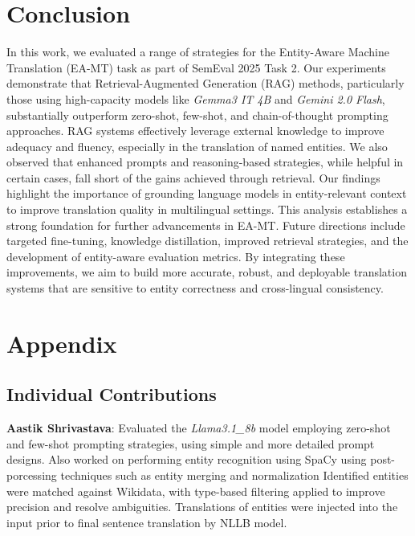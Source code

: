 \documentclass{ecai}
\begin{document}
\section{Conclusion}
\label{sec:conclusion}
In this work, we evaluated a range of strategies for the Entity-Aware Machine Translation (EA-MT) 
task as part of SemEval 2025 Task 2. Our experiments demonstrate that Retrieval-Augmented 
Generation (RAG) methods, particularly those using high-capacity models like \textit{Gemma3 IT 4B} 
and \textit{Gemini 2.0 Flash}, substantially outperform zero-shot, few-shot, and chain-of-thought 
prompting approaches. RAG systems effectively leverage external knowledge to improve adequacy and 
fluency, especially in the translation of named entities.
We also observed that enhanced prompts and reasoning-based strategies, while helpful in certain 
cases, fall short of the gains achieved through retrieval. Our findings highlight the importance
of grounding language models in entity-relevant context to improve translation quality in 
multilingual settings.
This analysis establishes a strong foundation for further advancements in EA-MT. 
Future directions include targeted fine-tuning, knowledge distillation, improved retrieval 
strategies, and the development of entity-aware evaluation metrics. By integrating these 
improvements, we aim to build more accurate, robust, and deployable translation systems that 
are sensitive to entity correctness and cross-lingual consistency.




\clearpage
\renewcommand{\thesection}{A}
\renewcommand{\thesubsection}{A.\arabic{subsection}}

\section{Appendix}

\subsection{Individual Contributions}

\textbf{Aastik Shrivastava}: Evaluated the \textit{Llama3.1\_8b} model employing zero-shot and few-shot prompting strategies, using simple 
and more detailed prompt designs. Also worked on performing entity recognition using SpaCy using post-porcessing techniques such as 
entity merging and normalization Identified entities were matched against Wikidata, with type-based filtering applied to improve precision and resolve ambiguities. 
Translations of entities were injected into the input prior to final sentence translation by NLLB model.
\end{document}
